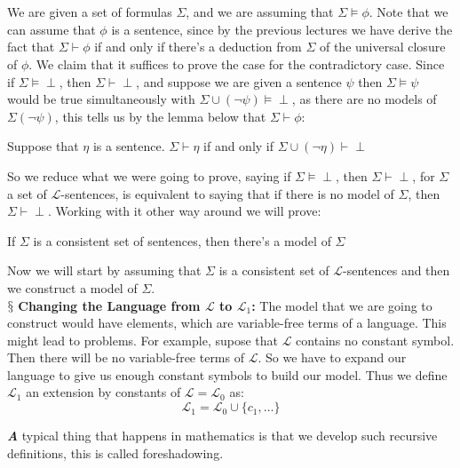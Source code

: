 \documentclass[9pt,a4paper, twocolumn]{article}
\newenvironment{callout}
	{\begin{calloutbox}\color{charcoal}\textbf\textit}
	{\end{calloutbox}}
\newcommand{\newpoint}[1]{\ \\ \indent$\mathsection$ \textbf{#1}}
\newcommand{\curveL}{\mathcal{L}}
\begin{document}
        \\
        \\
        We are given a set of formulas $\Sigma$, and we are assuming that $\Sigma\vDash \phi$. Note that we can assume that $\phi$ is a sentence, since by the previous lectures we have derive the fact that $\Sigma \vdash \phi$ if and only if there's a deduction from $\Sigma$ of the universal closure of $\phi$. We claim that it suffices to prove the case for the contradictory case. Since if $\Sigma\vDash\perp$, then $\Sigma \vdash \perp$, and suppose we are given a sentence $\psi$ then $\Sigma \vDash \psi$ would be true simultaneously with $\Sigma\cup(\neg\psi) \vDash \perp$, as there are no models of $\Sigma (\neg\psi)$, this tells us by the lemma below that $\Sigma \vdash \phi$:
        \begin{lemma}
            Suppose that $\eta$ is a sentence. $\Sigma\vdash \eta$ if and only if $\Sigma \cup (\neg \eta)\vdash \perp$
        \end{lemma} 
        So we reduce what we were going to prove, saying if $\Sigma\vDash \perp$, then $\Sigma \vdash \perp$, for $\Sigma$ a set of $\curveL$-sentences, is equivalent to saying that if there is no model of $\Sigma$, then $\Sigma \vdash \perp$.  Working with it other way around we will prove:
        \begin{center}
            If $\Sigma$ is a consistent set of sentences, then there's a model of $\Sigma$
        \end{center}
        Now we will start by assuming that $\Sigma$ is a consistent set of $\curveL$-sentences and then we construct a model of $\Sigma$.
        \newpoint{Changing the Language from $\curveL$ to $\curveL_1$:} The model that we are going to construct would have elements, which are variable-free terms of a language. This might lead to problems. For example, supose that $\curveL$ contains no constant symbol. Then there will be no variable-free terms of $\curveL$. So we have to expand our language to give us enough constant symbols to build our model. Thus we define $\curveL_1$ an extension by constants of $\curveL = \curveL_0$ as: 
        \begin{equation}
            \curveL_1 = \curveL_0 \cup \{ c_1,\dots\}
        \end{equation}
        \begin{callout}
            A typical thing that happens in mathematics is that we develop such recursive definitions, this is called foreshadowing.
        \end{callout}
\end{document}
